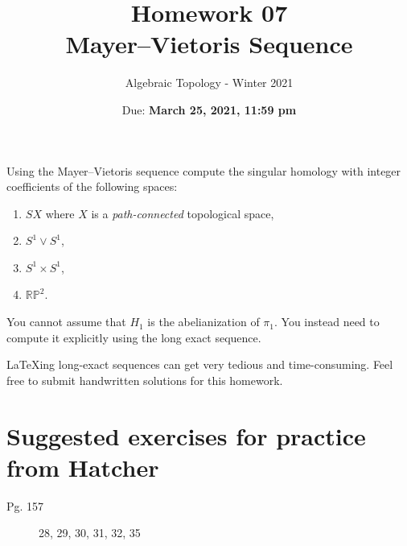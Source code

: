 \documentclass{article}
\title{Homework 07 \\ Mayer--Vietoris Sequence}
\author{Algebraic Topology - Winter 2021}
\date{Due: \textbf{March 25, 2021, 11:59 pm}}
\begin{document}
\maketitle

Using the Mayer--Vietoris sequence compute the singular homology with integer coefficients of the following spaces:
\begin{enumerate}
    \item $SX$ where $X$ is a \emph{path-connected} topological space,
    \item $S^1 \vee S^1$,
    \item $S^1 \times S^1$,
    \item $\mathbb{RP}^2$.
\end{enumerate}
You cannot assume that $H_1$ is the abelianization of $\pi_1$. You instead need to compute it explicitly using the long exact sequence.

\LaTeX ing long-exact sequences can get very tedious and time-consuming. Feel free to submit handwritten solutions for this homework.

\newpage
\section*{Suggested exercises for practice from Hatcher}

\begin{description}
\item[Pg. 157] 28, 29, 30, 31, 32, 35
\end{description}
\end{document}
